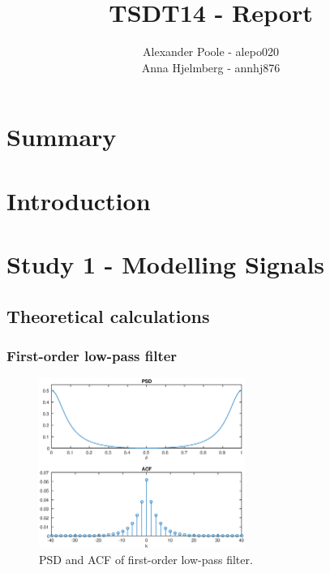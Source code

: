 \documentclass[a4paper,12pt]{article}
\title{TSDT14 - Report}
\author{Alexander Poole - alepo020 \\ Anna Hjelmberg - annhj876}
\begin{document}
\maketitle
	\thispagestyle{empty}
\newpage

\section{Summary}

\newpage
\tableofcontents
\newpage

\section{Introduction}




\section{Study 1 - Modelling Signals}




\subsection{Theoretical calculations}




\subsubsection{First-order low-pass filter}

\begin{figure}[h]
\centering
\includegraphics[width=0.6\textwidth]{bilder/Lab1/Lab1fig1.eps}
\caption{PSD and ACF of first-order low-pass filter.}
\label{fig:Lab1fig1}
\end{figure}
\end{document}
